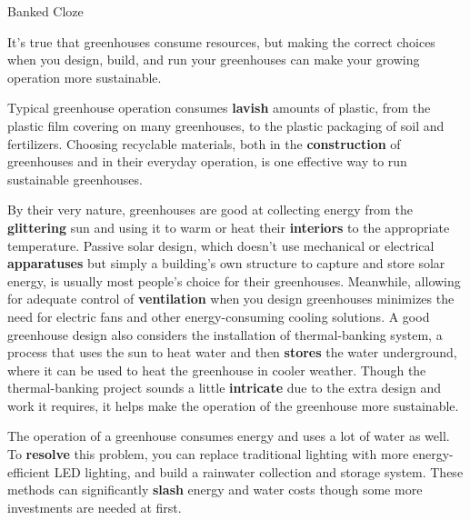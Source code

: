 \begin{question}{Banked Cloze}

It's true that greenhouses consume resources, but making the correct choices when you design, build, and run your greenhouses can make your growing operation more sustainable.

Typical greenhouse operation consumes {\color{red}\textbf{lavish}} amounts of plastic, from the plastic film covering on many greenhouses, to the plastic packaging of soil and fertilizers. Choosing recyclable materials, both in the {\color{red}\textbf{construction}} of greenhouses and in their everyday operation, is one effective way to run sustainable greenhouses.

By their very nature, greenhouses are good at collecting energy from the {\color{red}\textbf{glittering}} sun and using it to warm or heat their {\color{red}\textbf{interiors}} to the appropriate temperature. Passive solar design, which doesn't use mechanical or electrical {\color{red}\textbf{apparatuses}} but simply a building's own structure to capture and store solar energy, is usually most people's choice for their greenhouses. Meanwhile, allowing for adequate control of {\color{red}\textbf{ventilation}} when you design greenhouses minimizes the need for electric fans and other energy-consuming cooling solutions. A good greenhouse design also considers the installation of thermal-banking system, a process that uses the sun to heat water and then {\color{red}\textbf{stores}} the water underground, where it can be used to heat the greenhouse in cooler weather. Though the thermal-banking project sounds a little {\color{red}\textbf{intricate}} due to the extra design and work it requires, it helps make the operation of the greenhouse more sustainable.

The operation of a greenhouse consumes energy and uses a lot of water as well. To {\color{red}\textbf{resolve}} this problem, you can replace traditional lighting with more energy-efficient LED lighting, and build a rainwater collection and storage system. These methods can significantly {\color{red}\textbf{slash}} energy and water costs though some more investments are needed at first.
	
\end{question}

\newpage